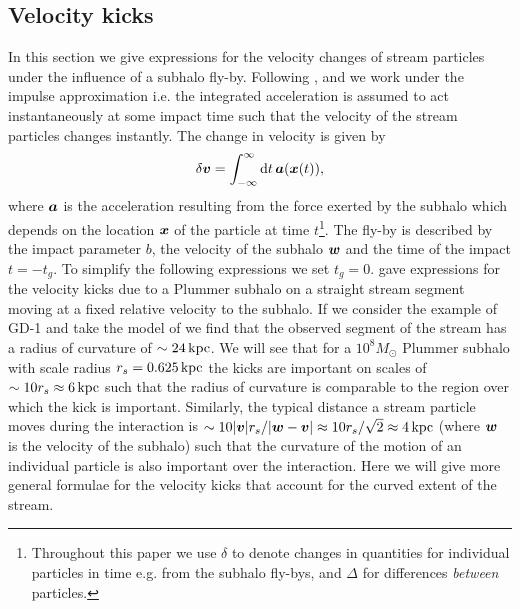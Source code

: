 \documentclass[useAMS,usenatbib,fleqn,a4paper]{mn2e}
\def\d{{\rm d}}
\def\kpc{\,{\rm kpc}}
\newcommand{\bs}[1]{\bmath{#1}}
\begin{document}
\subsection{Velocity kicks}
In this section we give expressions for the velocity changes of stream particles under the influence of a subhalo fly-by. Following \cite{YoonJohnstonHogg}, \cite{Carlberg2013} and \cite{ErkalBelokurov2015} we work under the impulse approximation i.e. the integrated acceleration is assumed to act instantaneously at some impact time such that the velocity of the stream particles changes instantly. The change in velocity is given by
\begin{equation}
\delta\bs{v} = \int_{-\infty}^{\infty} \d t\,\bs{a}(\bs{x}(t)),
\end{equation}
where $\bs{a}$ is the acceleration resulting from the force exerted by the subhalo which depends on the location $\bs{x}$ of the particle at time $t$\footnote{Throughout this paper we use $\delta$ to denote changes in quantities for individual particles in time e.g. from the subhalo fly-bys, and $\Delta$ for differences \emph{between} particles.}. The fly-by is described by the impact parameter $b$, the velocity of the subhalo $\bs{w}$ and the time of the impact $t=-t_g$. To simplify the following expressions we set $t_g=0$. \cite{ErkalBelokurov2015} gave expressions for the velocity kicks due to a Plummer subhalo on a straight stream segment moving at a fixed relative velocity to the subhalo. If we consider the example of GD-1 and take the model of \cite{Koposov2010} we find that the observed segment of the stream has a radius of curvature of $\sim24\kpc$. We will see that for a $10^8M_\odot$ Plummer subhalo with scale radius $r_s=0.625\kpc$ the kicks are important on scales of $\sim10r_s\approx6\kpc$ such that the radius of curvature is comparable to the region over which the kick is important. Similarly, the typical distance a stream particle moves during the interaction is $\sim10|\bs{v}|r_s/|\bs{w}-\bs{v}|\approx10r_s/\sqrt{2}\approx4\kpc$ (where $\bs{w}$ is the velocity of the subhalo) such that the curvature of the motion of an individual particle is also important over the interaction. Here we will give more general formulae for the velocity kicks that account for the curved extent of the stream.
\end{document}
